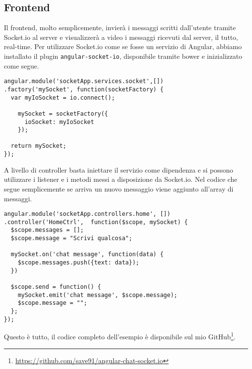 \subsection{Frontend}
Il frontend, molto semplicemente, invierà i messaggi scritti dall'utente tramite Socket.io al server e visualizzerà a video i messaggi ricevuti dal server, il tutto, real-time.
Per utilizzare Socket.io come se fosse un servizio di Angular, 
abbiamo installato il plugin \texttt{angular-socket-io}, disponibile tramite bower e inizializzato come segue.
\begin{lstlisting}[caption={service mySocket}, style=javaScriptCode]
angular.module('socketApp.services.socket',[])
.factory('mySocket', function(socketFactory) {
  var myIoSocket = io.connect();

    mySocket = socketFactory({
      ioSocket: myIoSocket
    });

  return mySocket;
});
\end{lstlisting} 
A livello di controller basta iniettare il servizio come dipendenza e si
possono utilizzare i listener e i metodi messi a disposizione da Socket.io.
Nel codice che segue semplicemente se arriva un nuovo messaggio viene aggiunto all'array di messaggi.
\begin{lstlisting}[caption={controller mySocket}, style=javaScriptCode]
angular.module('socketApp.controllers.home', [])
.controller('HomeCtrl',  function($scope, mySocket) {
  $scope.messages = [];
  $scope.message = "Scrivi qualcosa";

  mySocket.on('chat message', function(data) {
    $scope.messages.push({text: data});
  })

  $scope.send = function() {
    mySocket.emit('chat message', $scope.message);
    $scope.message = "";
  };
});
\end{lstlisting} 
Questo è tutto, il codice completo dell'esempio è disponibile sul mio GitHub\footnote{\url{https://github.com/save91/angular-chat-socket.io}}.



